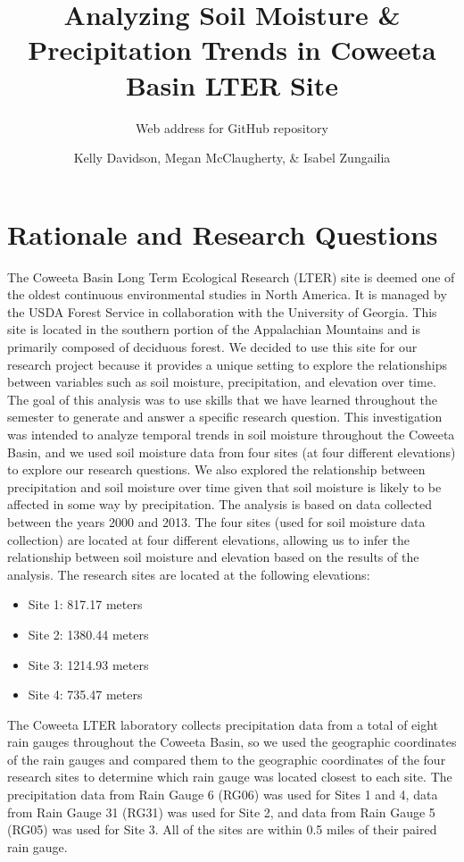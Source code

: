 \documentclass[
  12pt,
]{article}
\title{Analyzing Soil Moisture \& Precipitation Trends in Coweeta Basin
LTER Site}
\subtitle{Web address for GitHub repository}
\author{Kelly Davidson, Megan McClaugherty, \& Isabel Zungailia}
\date{}
\providecommand{\tightlist}{%
  \setlength{\itemsep}{0pt}\setlength{\parskip}{0pt}}
\begin{document}
\maketitle

\newpage
\tableofcontents 
\newpage
\listoftables 
\newpage
\listoffigures 
\newpage

\hypertarget{rationale-and-research-questions}{%
\section{Rationale and Research
Questions}\label{rationale-and-research-questions}}

The Coweeta Basin Long Term Ecological Research (LTER) site is deemed
one of the oldest continuous environmental studies in North America. It
is managed by the USDA Forest Service in collaboration with the
University of Georgia. This site is located in the southern portion of
the Appalachian Mountains and is primarily composed of deciduous forest.
We decided to use this site for our research project because it provides
a unique setting to explore the relationships between variables such as
soil moisture, precipitation, and elevation over time. The goal of this
analysis was to use skills that we have learned throughout the semester
to generate and answer a specific research question. This investigation
was intended to analyze temporal trends in soil moisture throughout the
Coweeta Basin, and we used soil moisture data from four sites (at four
different elevations) to explore our research questions. We also
explored the relationship between precipitation and soil moisture over
time given that soil moisture is likely to be affected in some way by
precipitation. The analysis is based on data collected between the years
2000 and 2013. The four sites (used for soil moisture data collection)
are located at four different elevations, allowing us to infer the
relationship between soil moisture and elevation based on the results of
the analysis. The research sites are located at the following
elevations:

\begin{itemize}
\tightlist
\item
  Site 1: 817.17 meters
\item
  Site 2: 1380.44 meters
\item
  Site 3: 1214.93 meters
\item
  Site 4: 735.47 meters
\end{itemize}

The Coweeta LTER laboratory collects precipitation data from a total of
eight rain gauges throughout the Coweeta Basin, so we used the
geographic coordinates of the rain gauges and compared them to the
geographic coordinates of the four research sites to determine which
rain gauge was located closest to each site. The precipitation data from
Rain Gauge 6 (RG06) was used for Sites 1 and 4, data from Rain Gauge 31
(RG31) was used for Site 2, and data from Rain Gauge 5 (RG05) was used
for Site 3. All of the sites are within 0.5 miles of their paired rain
gauge.
\end{document}
